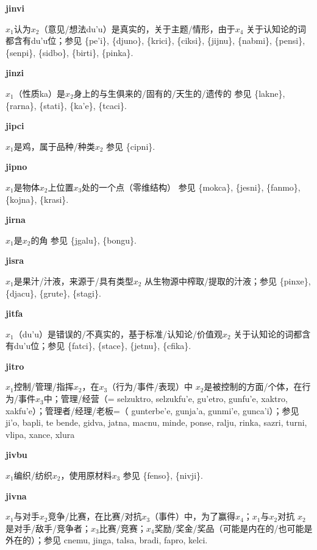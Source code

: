 \documentclass[notitlepage,twocolumn,a4paper,10pt]{book}
\begin{document}
{\sffamily\bfseries jinvi}\enspace {\ttfamily\bfseries[jiv     ji'i]}  $x_1$认为$x_2$（意见\slash{}想法du'u）是真实的，关于主题\slash{}情形，由于$x_4$ \textemdash{} 关于认知论的词都含有du'u位；参见 \{pe'i\}, \{djuno\}, \{krici\}, \{ciksi\}, \{jijnu\}, \{nabmi\}, \{pensi\}, \{senpi\}, \{sidbo\}, \{birti\}, \{pinka\}.

{\sffamily\bfseries jinzi}\enspace {\ttfamily\bfseries[jiz]}  $x_1$（性质ka）是$x_2$身上的与生俱来的\slash{}固有的\slash{}天生的\slash{}遗传的 \textemdash{} 参见 \{lakne\}, \{rarna\}, \{stati\}, \{ka'e\}, \{tcaci\}.

{\sffamily\bfseries jipci} $x_1$是鸡，属于品种\slash{}种类$x_2$ \textemdash{} 参见 \{cipni\}.

{\sffamily\bfseries jipno}\enspace {\ttfamily\bfseries[jip     ji'o]}  $x_1$是物体$x_2$上位置$x_3$处的一个点（零维结构） \textemdash{} 参见 \{mokca\}, \{jesni\}, \{fanmo\}, \{kojna\}, \{krasi\}.

{\sffamily\bfseries jirna} $x_1$是$x_2$的角 \textemdash{} 参见 \{jgalu\}, \{bongu\}.

{\sffamily\bfseries jisra} $x_1$是果汁\slash{}汁液，来源于\slash{}具有类型$x_2$ \textemdash{} 从生物源中榨取\slash{}提取的汁液；参见 \{pinxe\}, \{djacu\}, \{grute\}, \{stagi\}.

{\sffamily\bfseries jitfa}\enspace {\ttfamily\bfseries[jif]}  $x_1$（du'u）是错误的\slash{}不真实的，基于标准\slash{}认知论\slash{}价值观$x_2$ \textemdash{} 关于认知论的词都含有du'u位；参见 \{fatci\}, \{stace\}, \{jetnu\}, \{cfika\}.

{\sffamily\bfseries jitro}\enspace {\ttfamily\bfseries[    tro]}  $x_1$控制\slash{}管理\slash{}指挥$x_2$，在$x_3$（行为\slash{}事件\slash{}表现）中 \textemdash{} $x_2$是被控制的方面\slash{}个体，在行为\slash{}事件$x_3$中；管理\slash{}经营（= {selzuktro}, {selzukfu'e}, {gu'etro}, {gunfu'e}, {xaktro}, {xakfu'e}）；管理者\slash{}经理\slash{}老板=（ {gunterbe'e}, {gunja'a}, {gunmi'e}, {gunca'i}）；参见 {ji'o}, {bapli}, te {bende}, {gidva}, {jatna}, {macnu}, {minde}, {ponse}, {ralju}, {rinka}, {sazri}, {turni}, {vlipa}, {xance}, {xlura}

{\sffamily\bfseries jivbu} $x_1$编织\slash{}纺织$x_2$，使用原材料$x_3$ \textemdash{} 参见 \{fenso\}, \{nivji\}.

{\sffamily\bfseries jivna}\enspace {\ttfamily\bfseries[    jvi]}  $x_1$与对手$x_2$竞争\slash{}比赛，在比赛\slash{}对抗$x_3$（事件）中，为了赢得$x_4$；$x_1$与$x_2$对抗 \textemdash{} $x_2$是对手\slash{}敌手\slash{}竞争者；$x_3$比赛\slash{}竞赛；$x_4$奖励\slash{}奖金\slash{}奖品（可能是内在的\slash{}也可能是外在的）；参见 {cnemu}, {jinga}, {talsa}, {bradi}, {fapro}, {kelci}.
\end{document}
